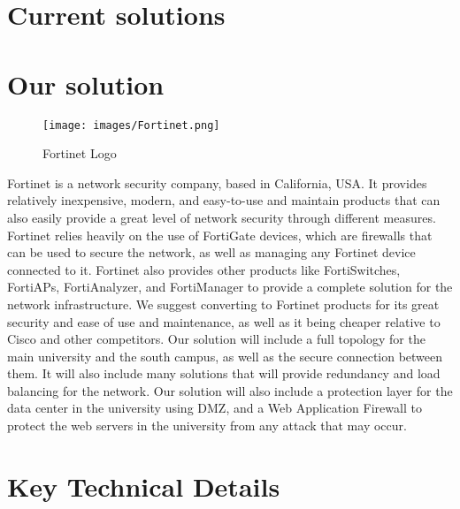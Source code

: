 \documentclass[12pt]{report}
\begin{document}
\section{Current solutions}
\section{Our solution}
\begin{figure}[h]
    \centering
    \texttt{[image: images/Fortinet.png]}
    \caption{Fortinet Logo \cite{FTLogo}}
    \label{fig:fortinet logo}
\end{figure}
Fortinet is a network security company, based in California, USA.\cite{wikipedia} It provides relatively inexpensive, modern, and easy-to-use and maintain products that can also easily provide a great level of network security through different measures.\cite{sigbil} Fortinet relies heavily on the use of FortiGate devices, which are firewalls that can be used to secure the network, as well as managing any Fortinet device connected to it. Fortinet also provides other products like FortiSwitches, FortiAPs, FortiAnalyzer, and FortiManager to provide a complete solution for the network infrastructure. \cite{FortinetProducts}
We suggest converting to Fortinet products for its great security and ease of use and maintenance, as well as it being cheaper relative to Cisco \cite{Cheaper} and other competitors.
Our solution will include a full topology for the main university and the south campus, as well as the secure connection between them. It will also include many solutions that will provide redundancy and load balancing for the network.
Our solution will also include a protection layer for the data center in the university using DMZ, and a Web Application Firewall to protect the web servers in the university from any attack that may occur.
\section{Key Technical Details}
\end{document}
